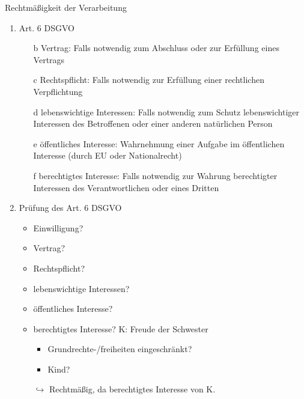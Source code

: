 \documentclass{article}
\begin{document}
\begin{exercise}{Rechtmäßigkeit der Verarbeitung}
  \begin{solution}
    \begin{enumerate}
      \item Art. 6 DSGVO
            \begin{itemize}
              \item[b] Vertrag: Falls notwendig zum Abschluss oder zur Erfüllung eines Vertrags
              \item[c] Rechtspflicht: Falls notwendig zur Erfüllung einer rechtlichen Verpflichtung
              \item[d] lebenswichtige Interessen: Falls notwendig zum Schutz lebenswichtiger Interessen des Betroffenen oder einer anderen natürlichen Person
              \item[e] öffentliches Interesse: Wahrnehmung einer Aufgabe im öffentlichen Interesse (durch EU oder Nationalrecht)
              \item[f] berechtigtes Interesse: Falls notwendig zur Wahrung berechtigter Interessen des Verantwortlichen oder eines Dritten
            \end{itemize}
      \item Prüfung des Art. 6 DSGVO
            \begin{itemize}
              \item Einwilligung? \xmark
              \item Vertrag? \xmark
              \item Rechtspflicht? \xmark
              \item lebenswichtige Interessen? \xmark
              \item öffentliches Interesse? \xmark
              \item berechtigtes Interesse? K: Freude der Schwester \checkmark
                    \begin{itemize}
                      \item Grundrechte-/freiheiten eingeschränkt? \xmark
                      \item Kind? \xmark
                    \end{itemize}
              \item[$\hookrightarrow$] Rechtmäßig, da berechtigtes Interesse von K.
            \end{itemize}
    \end{enumerate}
  \end{solution}
\end{exercise}
\end{document}
